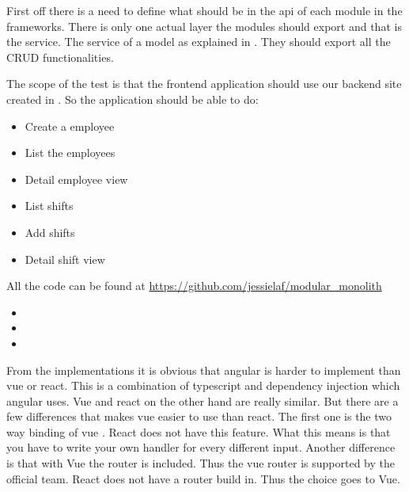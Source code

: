 First off there is a need to define what should be in the api of each module in the frameworks. There is only one actual layer the modules should export and that is the service. The service of a model as explained in . They should export all the CRUD functionalities.

The scope of the test is that the frontend application should use our backend site created in . So the application should be able to do:

\begin{itemize}
    \item Create a employee
    \item List the employees
    \item Detail employee view
    \item List shifts
    \item Add shifts
    \item Detail shift view
\end{itemize}

All the code can be found at \url{https://github.com/jessielaf/modular_monolith}

\begin{itemize}
    \item {}
    \item {}
    \item {}
\end{itemize}

From the implementations it is obvious that angular is harder to implement than vue or react. This is a combination of typescript and dependency injection which angular uses. Vue and react on the other hand are really similar. But there are a few differences that makes vue easier to use than react. The first one is the two way binding of vue \cite{vueTwoWay}. React does not have this feature. What this means is that you have to write your own handler for every different input. Another difference is that with Vue the router is included. Thus the vue router is supported by the official team. React does not have a router build in. Thus the choice goes to Vue.
